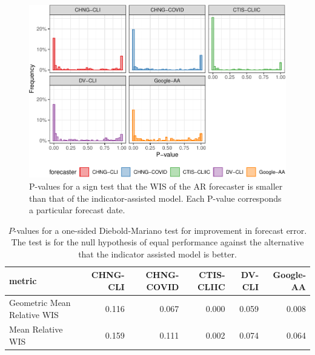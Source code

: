 \documentclass[9pt,twoside,lineno]{pnas-new}
\begin{document}
\clearpage

\begin{figure}

{\centering \includegraphics[width=\textwidth]{fig/sign-test-1} 

}

\caption{P-values for a sign test that the WIS of the AR forecaster is smaller than that of the indicator-assisted model. Each P-value corresponds a particular forecast date.}\label{fig:sign-test}
\end{figure}

\begin{table}

\caption{\label{tab:dm-test}$P$-values for a one-sided Diebold-Mariano test for improvement in forecast error. The test is for the null hypothesis of equal performance against the alternative that the indicator assisted model is better.}
\centering
\begin{tabular}[t]{lrrrrr}
\toprule
metric & CHNG-CLI & CHNG-COVID & CTIS-CLIIC & DV-CLI & Google-AA\\
\midrule
Geometric Mean Relative WIS & 0.116 & 0.067 & 0.000 & 0.059 & 0.008\\
Mean Relative WIS & 0.159 & 0.111 & 0.002 & 0.074 & 0.064\\
\bottomrule
\end{tabular}
\end{table}
\end{document}
